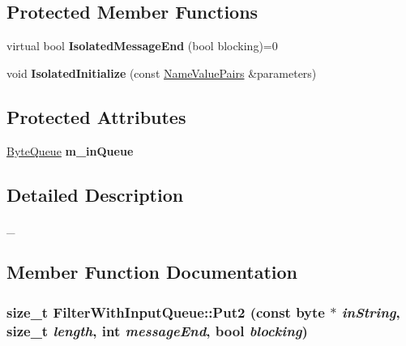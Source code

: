 \subsection*{Protected Member Functions}
\begin{DoxyCompactItemize}
\item 
\hypertarget{class_filter_with_input_queue_a57f7ff32bf82bf74e67b355b90a8f25e}{
virtual bool {\bfseries IsolatedMessageEnd} (bool blocking)=0}
\label{class_filter_with_input_queue_a57f7ff32bf82bf74e67b355b90a8f25e}

\item 
\hypertarget{class_filter_with_input_queue_a94b46e509ab5cb9dbd676c41ea346107}{
void {\bfseries IsolatedInitialize} (const \hyperlink{class_name_value_pairs}{NameValuePairs} \&parameters)}
\label{class_filter_with_input_queue_a94b46e509ab5cb9dbd676c41ea346107}

\end{DoxyCompactItemize}
\subsection*{Protected Attributes}
\begin{DoxyCompactItemize}
\item 
\hypertarget{class_filter_with_input_queue_ab55f3464c5a802e5504dd39569f5bd7c}{
\hyperlink{class_byte_queue}{ByteQueue} {\bfseries m\_\-inQueue}}
\label{class_filter_with_input_queue_ab55f3464c5a802e5504dd39569f5bd7c}

\end{DoxyCompactItemize}


\subsection{Detailed Description}
\_\- 

\subsection{Member Function Documentation}
\hypertarget{class_filter_with_input_queue_a91c11ca74a8ba2350da6ad6ca8d721a0}{
\subsubsection[{Put2}]{\setlength{\rightskip}{0pt plus 5cm}size\_\-t FilterWithInputQueue::Put2 (const byte $\ast$ {\em inString}, \/  size\_\-t {\em length}, \/  int {\em messageEnd}, \/  bool {\em blocking})}}
\label{class_filter_with_input_queue_a91c11ca74a8ba2350da6ad6ca8d721a0}


